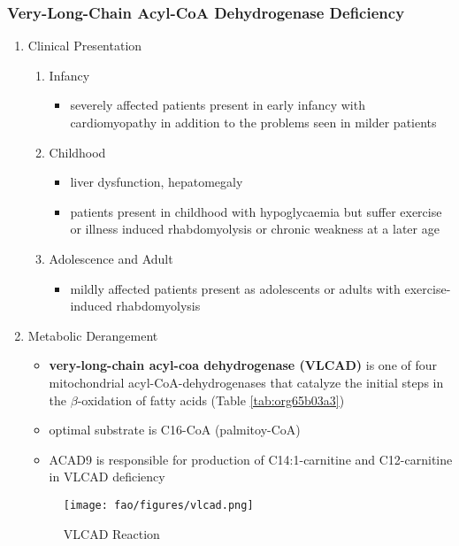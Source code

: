 \documentclass[12pt]{scrartcl}
\begin{document}
\subsubsection{Very-Long-Chain Acyl-CoA Dehydrogenase Deficiency}
\label{sec:orgb29699b}
\begin{enumerate}
\item Clinical Presentation
\label{sec:org8570c26}
\begin{enumerate}
\item Infancy
\label{sec:orgff59946}
\begin{itemize}
\item severely affected patients present in early infancy with
cardiomyopathy in addition to the problems seen in milder patients
\end{itemize}
\item Childhood
\label{sec:orgedeb25e}
\begin{itemize}
\item liver dysfunction, hepatomegaly
\item patients present in childhood with hypoglycaemia but suffer exercise
or illness induced rhabdomyolysis or chronic weakness at a later age
\end{itemize}
\item Adolescence and Adult
\label{sec:orgf23ff15}
\begin{itemize}
\item mildly affected patients present as adolescents or adults with
exercise-induced rhabdomyolysis
\end{itemize}
\end{enumerate}
\item Metabolic Derangement
\label{sec:orgf81e149}
\begin{itemize}
\item \textbf{very-long-chain acyl-coa dehydrogenase (VLCAD)} is one of four
mitochondrial acyl-CoA-dehydrogenases that catalyze the initial
steps in the \(\beta\)-oxidation of fatty acids (Table \ref{tab:org65b03a3})
\item optimal substrate is C16-CoA (palmitoy-CoA)
\item ACAD9 is responsible for production of C14:1-carnitine and
C12-carnitine in VLCAD deficiency
\end{itemize}

\begin{figure}[htbp]
\centering
\texttt{[image: fao/figures/vlcad.png]}
\caption{\label{fig:org50e847b}VLCAD Reaction}
\end{figure}


\end{enumerate}
\end{document}
